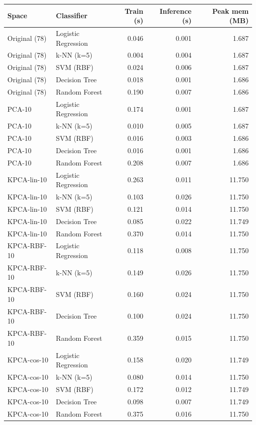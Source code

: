 \begin{tabular}{llrrr}
\toprule
Space & Classifier & Train (s) & Inference (s) & Peak mem (MB) \\
\midrule
Original (78) & Logistic Regression & 0.046 & 0.001 & 1.687 \\
Original (78) & k-NN (k=5) & 0.004 & 0.004 & 1.687 \\
Original (78) & SVM (RBF) & 0.024 & 0.006 & 1.687 \\
Original (78) & Decision Tree & 0.018 & 0.001 & 1.686 \\
Original (78) & Random Forest & 0.190 & 0.007 & 1.686 \\
PCA-10 & Logistic Regression & 0.174 & 0.001 & 1.687 \\
PCA-10 & k-NN (k=5) & 0.010 & 0.005 & 1.687 \\
PCA-10 & SVM (RBF) & 0.016 & 0.003 & 1.686 \\
PCA-10 & Decision Tree & 0.016 & 0.001 & 1.686 \\
PCA-10 & Random Forest & 0.208 & 0.007 & 1.686 \\
KPCA-lin-10 & Logistic Regression & 0.263 & 0.011 & 11.750 \\
KPCA-lin-10 & k-NN (k=5) & 0.103 & 0.026 & 11.750 \\
KPCA-lin-10 & SVM (RBF) & 0.121 & 0.014 & 11.750 \\
KPCA-lin-10 & Decision Tree & 0.085 & 0.022 & 11.749 \\
KPCA-lin-10 & Random Forest & 0.370 & 0.014 & 11.750 \\
KPCA-RBF-10 & Logistic Regression & 0.118 & 0.008 & 11.750 \\
KPCA-RBF-10 & k-NN (k=5) & 0.149 & 0.026 & 11.750 \\
KPCA-RBF-10 & SVM (RBF) & 0.160 & 0.024 & 11.750 \\
KPCA-RBF-10 & Decision Tree & 0.100 & 0.024 & 11.750 \\
KPCA-RBF-10 & Random Forest & 0.359 & 0.015 & 11.750 \\
KPCA-cos-10 & Logistic Regression & 0.158 & 0.020 & 11.749 \\
KPCA-cos-10 & k-NN (k=5) & 0.080 & 0.014 & 11.750 \\
KPCA-cos-10 & SVM (RBF) & 0.172 & 0.012 & 11.749 \\
KPCA-cos-10 & Decision Tree & 0.098 & 0.007 & 11.749 \\
KPCA-cos-10 & Random Forest & 0.375 & 0.016 & 11.750 \\
\bottomrule
\end{tabular}
